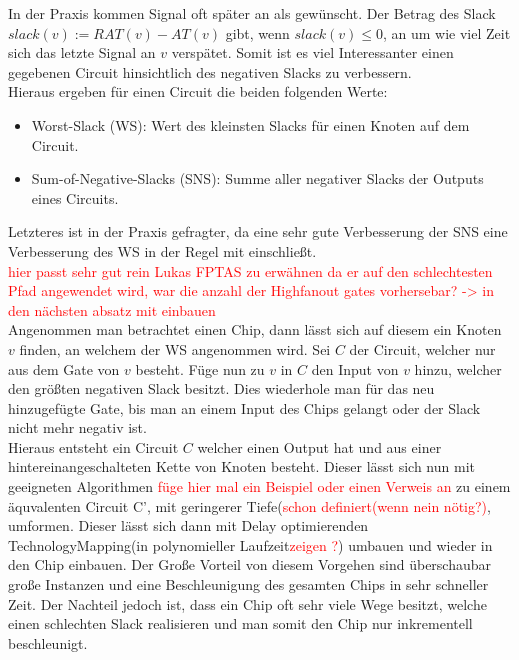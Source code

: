 \documentclass[11pt, a4paper, german]{article}
\newcommand{\TM}{TechnologyMapping}
\begin{document}
In der Praxis kommen Signal oft später an als gewünscht. Der Betrag des Slack $slack(v) := RAT(v) - AT(v)$ gibt, wenn $slack(v) \leq 0 $, an um wie viel Zeit sich das letzte Signal an $v$ verspätet. Somit ist es viel Interessanter einen gegebenen Circuit hinsichtlich des negativen Slacks zu verbessern. \\
Hieraus ergeben für einen Circuit die beiden folgenden Werte: 
\begin{itemize}
	\item Worst-Slack (WS): Wert des kleinsten Slacks für einen Knoten auf dem Circuit.
	\item Sum-of-Negative-Slacks (SNS): Summe aller negativer Slacks der Outputs eines Circuits.
\end{itemize}
Letzteres ist in der Praxis gefragter, da eine sehr gute Verbesserung der SNS eine Verbesserung des WS in der Regel mit einschließt. \\

\textcolor{red}{hier passt sehr gut rein Lukas FPTAS zu erwähnen da er auf den schlechtesten Pfad angewendet wird, war die anzahl der Highfanout gates vorhersebar? -> in den nächsten absatz mit einbauen}\\

Angenommen man betrachtet einen Chip, dann lässt sich auf diesem ein Knoten $v$ finden, an welchem der WS angenommen wird. Sei $C$ der Circuit, welcher nur aus dem Gate von $v$ besteht. Füge nun zu $v$ in $C$ den Input von $v$ hinzu, welcher den größten negativen Slack besitzt. Dies wiederhole man für das neu hinzugefügte Gate, bis man an einem Input des Chips gelangt oder der Slack nicht mehr negativ ist. \\
Hieraus entsteht ein Circuit $C$ welcher einen Output hat und aus einer hintereinangeschalteten Kette von Knoten besteht. Dieser lässt sich nun mit geeigneten Algorithmen \textcolor{red}{füge hier mal ein Beispiel oder einen Verweis an} zu einem äquvalenten Circuit C', mit geringerer Tiefe(\textcolor{red}{schon definiert(wenn nein nötig?)}, umformen. Dieser lässt sich dann mit  Delay optimierenden \TM (in polynomieller Laufzeit\textcolor{red}{zeigen ?}) umbauen und wieder in den Chip einbauen. Der Große Vorteil von diesem Vorgehen sind überschaubar große Instanzen und eine Beschleunigung des gesamten Chips in sehr schneller Zeit. Der Nachteil jedoch ist, dass ein Chip oft sehr viele Wege besitzt, welche einen schlechten Slack realisieren und man somit den Chip nur inkrementell beschleunigt.\\
\end{document}
